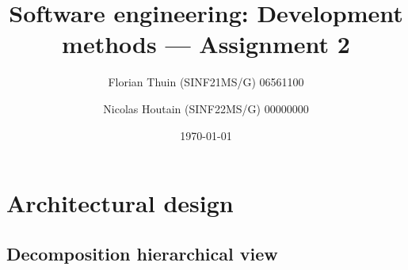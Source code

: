 \documentclass[a4paper, 11pt]{article}
\author{Florian Thuin (SINF21MS/G) 06561100 \and Nicolas Houtain (SINF22MS/G) 00000000}
\date{\today}
\title{Software engineering: Development methods --- Assignment 2}
\begin{document}
    \maketitle
    \tableofcontents
    \clearpage{}

    \section{Architectural design}
    \subsection{Decomposition hierarchical view}

\end{document}

